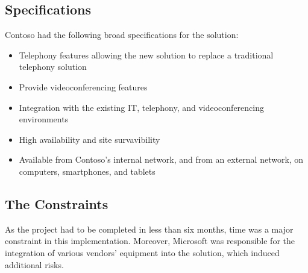 \subsection{Specifications}
	Contoso had the following broad specifications for the solution:
	\begin{itemize}
		\item Telephony features allowing the new solution to replace a traditional telephony solution
		\item Provide videoconferencing features
		\item Integration with the existing IT, telephony, and videoconferencing environments
		\item High availability and site survavibility
		\item Available from Contoso's internal network, and from an external network, on computers, smartphones, and tablets
	\end{itemize}

\subsection{The Constraints}
	As the project had to be completed in less than six months, time was a major constraint in this implementation.
	Moreover, Microsoft was responsible for the integration of various vendors' equipment into the solution, which induced additional risks.

